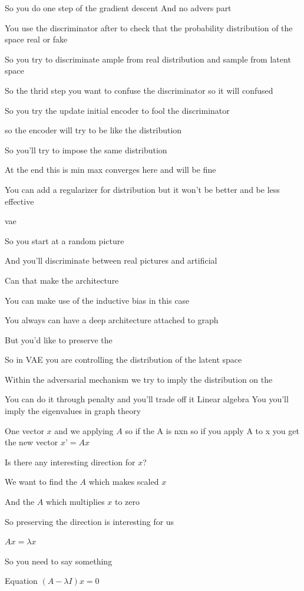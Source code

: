 \documentclass{article}
\begin{document}
So you do one step of the gradient descent 
And no advers part

You use the discriminator after to check that the probability distribution of the space real or fake

So you try to discriminate ample from real distribution and sample from latent space 

So the thrid step you want to confuse the discriminator so it will  confused 

So you try the update initial encoder to fool the discriminator 

so the encoder will try to be like the distribution

So you’ll try to impose the same distribution 

At the end this is min max converges here and will be fine

You can add a regularizer for distribution but it won’t be better and be less effective

vae 

So you start at a random picture

And you’ll discriminate between real pictures and artificial

Can that make the architecture 

You can make use of the inductive bias in this case

You always can have a deep architecture attached to graph

But you’d like to preserve the 

So in VAE you are controlling the distribution of the latent space 

Within the adversarial mechanism we try to imply the distribution on the

You can do it through penalty and you’ll trade off it
Linear algebra
You you’ll imply the eigenvalues in graph theory

One vector $x$ and we applying $A$ so if the A is nxn so if you apply A to x you get the new vector $x’ = Ax$

Is there any interesting direction for $x$?

We want to find the $A$ which makes scaled $x$

And the $A$ which multiplies $x$ to zero

So preserving the direction is interesting for us

$Ax= \lambda x$

So you need to say something

Equation $(A - \lambda I)x= 0$
\end{document}

